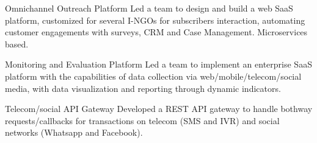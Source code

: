 
\begin{cvdesc}

  \cvdesch
    {Omnichannel Outreach Platform} %
    {Led a team to design and build a web SaaS platform, customized for several I-NGOs for subscribers interaction, automating customer engagements with surveys, CRM and Case Management. Microservices based.}
    
  \cvdesch
    {Monitoring and Evaluation Platform} %
    {Led a team to implement an enterprise SaaS platform with the capabilities of data collection via web/mobile/telecom/social media, with data visualization and reporting through dynamic indicators.}
    
  \cvdesch
    {Telecom/social API Gateway} %
    {Developed a REST API gateway to handle bothway requests/callbacks for transactions on telecom (SMS and IVR) and social networks (Whatsapp and Facebook).}

\end{cvdesc}
